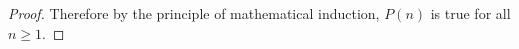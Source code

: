 \documentclass[11pt]{exam}
\begin{document}
\begin{questions}
\begin{solution}
\begin{proof}
		Therefore by the principle of mathematical induction, $P(n)$ is true for all $n \ge 1$.
	\end{proof}

\end{solution}


%
%
%
%
%
%
%








\end{questions}
\end{document}
